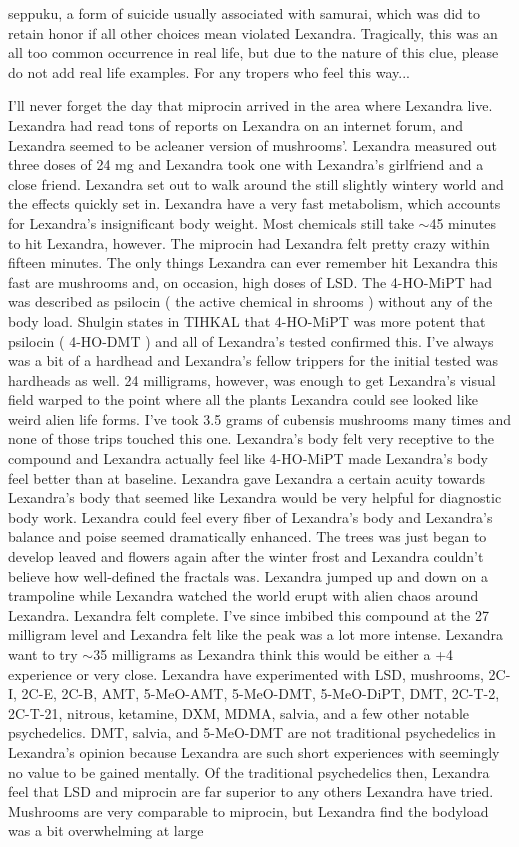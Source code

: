 \documentclass[12pt]{book}
\begin{document}
seppuku, a form of suicide usually associated with samurai, which was did to retain honor if all other choices mean violated Lexandra. Tragically, this was an all too common occurrence in real life, but due to the nature of this clue, please do not add real life examples. For any tropers who feel this way...



I'll never forget the day that miprocin arrived in the area where Lexandra live. Lexandra had read tons of reports on Lexandra on an internet forum, and Lexandra seemed to be acleaner version of mushrooms'. Lexandra measured out three doses of 24 mg and Lexandra took one with Lexandra's girlfriend and a close friend. Lexandra set out to walk around the still slightly wintery world and the effects quickly set in. Lexandra have a very fast metabolism, which accounts for Lexandra's insignificant body weight. Most chemicals still take $\sim$45 minutes to hit Lexandra, however. The miprocin had Lexandra felt pretty crazy within fifteen minutes. The only things Lexandra can ever remember hit Lexandra this fast are mushrooms and, on occasion, high doses of LSD. The 4-HO-MiPT had was described as psilocin ( the active chemical in shrooms ) without any of the body load. Shulgin states in TIHKAL that 4-HO-MiPT was more potent that psilocin ( 4-HO-DMT ) and all of Lexandra's tested confirmed this. I've always was a bit of a hardhead and Lexandra's fellow trippers for the initial tested was hardheads as well. 24 milligrams, however, was enough to get Lexandra's visual field warped to the point where all the plants Lexandra could see looked like weird alien life forms. I've took 3.5 grams of cubensis mushrooms many times and none of those trips touched this one. Lexandra's body felt very receptive to the compound and Lexandra actually feel like 4-HO-MiPT made Lexandra's body feel better than at baseline. Lexandra gave Lexandra a certain acuity towards Lexandra's body that seemed like Lexandra would be very helpful for diagnostic body work. Lexandra could feel every fiber of Lexandra's body and Lexandra's balance and poise seemed dramatically enhanced. The trees was just began to develop leaved and flowers again after the winter frost and Lexandra couldn't believe how well-defined the fractals was. Lexandra jumped up and down on a trampoline while Lexandra watched the world erupt with alien chaos around Lexandra. Lexandra felt complete. I've since imbibed this compound at the 27 milligram level and Lexandra felt like the peak was a lot more intense. Lexandra want to try $\sim$35 milligrams as Lexandra think this would be either a +4 experience or very close. Lexandra have experimented with LSD, mushrooms, 2C-I, 2C-E, 2C-B, AMT, 5-MeO-AMT, 5-MeO-DMT, 5-MeO-DiPT, DMT, 2C-T-2, 2C-T-21, nitrous, ketamine, DXM, MDMA, salvia, and a few other notable psychedelics. DMT, salvia, and 5-MeO-DMT are not traditional psychedelics in Lexandra's opinion because Lexandra are such short experiences with seemingly no value to be gained mentally. Of the traditional psychedelics then, Lexandra feel that LSD and miprocin are far superior to any others Lexandra have tried. Mushrooms are very comparable to miprocin, but Lexandra find the bodyload was a bit overwhelming at large 
\end{document}
